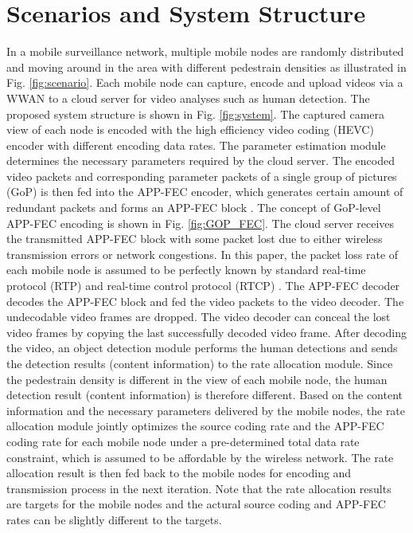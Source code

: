 \documentclass[journal]{IEEEtran}
\begin{document}
\section{Scenarios and System Structure}
In a mobile surveillance network, multiple mobile nodes are randomly distributed and moving around in the area with different pedestrain densities as illustrated in Fig. \ref{fig:scenario}. Each mobile node can capture, encode and upload videos via a WWAN to a cloud server for video analyses such as human detection. The proposed system structure is shown in Fig. \ref{fig:system}. The captured camera view of each node is encoded with the high efficiency video coding (HEVC) \cite{SOHW12} encoder with different encoding data rates. The parameter estimation module determines the necessary parameters required by the cloud server. The encoded video packets and corresponding parameter packets of a single group of pictures (GoP) is then fed into the APP-FEC encoder, which generates certain amount of redundant packets and forms an APP-FEC block \cite{WSHZ13,BaTO08}. The concept of GoP-level APP-FEC encoding is shown in Fig. \ref{fig:GOP_FEC}. The cloud server receives the transmitted APP-FEC block with some packet lost due to either wireless transmission errors or network congestions. In this paper, the packet loss rate of each mobile node is assumed to be perfectly known by standard real-time protocol (RTP) and real-time control protocol (RTCP) \cite{Perk03,CHWY15}. The APP-FEC decoder decodes the APP-FEC block and fed the video packets to the video decoder. The undecodable video frames are dropped. The video decoder can conceal the lost video frames by copying the last successfully decoded video frame. After decoding the video, an object detection module performs the human detections and sends the detection results (content information) to the rate allocation module. Since the pedestrain density is different in the view of each mobile node, the human detection result (content information) is therefore different. Based on the content information and the necessary parameters delivered by the mobile nodes, the rate allocation module jointly optimizes the source coding rate and the APP-FEC coding rate for each mobile node under a pre-determined total data rate constraint, which is assumed to be affordable by the wireless network. The rate allocation result is then fed back to the mobile nodes for encoding and transmission process in the next iteration. Note that the rate allocation results are targets for the mobile nodes and the actural source coding and APP-FEC rates can be slightly different to the targets.
\end{document}
